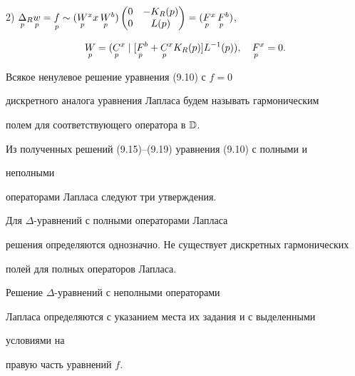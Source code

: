  


2) $\down{p}{\Delta}_R\down{p}{w}=\down{p}{f}\sim 


(\down{p}{W}^xx\,\down{p}{W}^b) 


\begin{pmatrix} 


0 & - K_R(p) \\ 0 & L(p) 


\end{pmatrix} 


=(\down{p}{F}^x\,\down{p}{F}^b) 


$, 


\begin{equation} 


\down{p}{W}=(\down{p}{C}^x\mid 


[\down{p}{F}^b+\down{p}{C}^x K_R(p)]L^{-1}(p)),\quad 


\down{p}{F}^x=0. 


\end{equation} 


 


\begin{defn} Всякое ненулевое решение уравнения (9.10) с $f=0$ 


дискретного аналога уравнения Лапласа будем называть гармоническим  


полем для соответствующего оператора в $\Bbb D$. 


\end{defn} 


 


Из полученных решений (9.15)--(9.19) уравнения (9.10) с полными и 


неполными  


операторами Лапласа следуют три утверждения. 


 


\begin{prop} Для $\Delta$-уравнений с полными операторами Лапласа 


решения определяются однозначно. Не существует дискретных гармонических 


полей для полных операторов Лапласа. 


\end{prop} 


 


\begin{prop} Решение $\Delta$-уравнений с неполными операторами 


Лапласа определяются с указанием места их задания и с выделенными 


условиями на  


правую часть уравнений $f$. 


\end{prop} 


